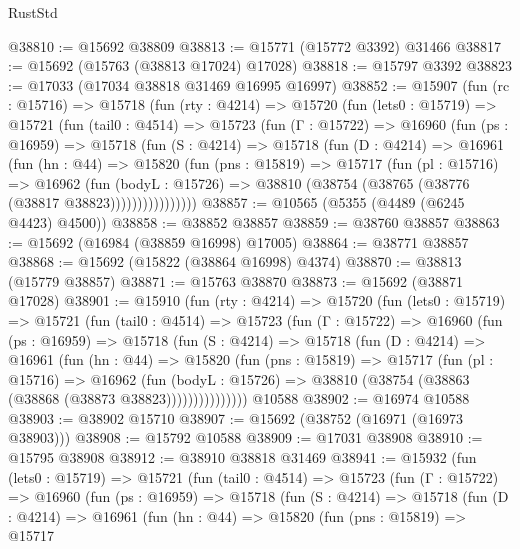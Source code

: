 \begin{lexlean}{RustStd}
\begin{coremodule}
@38810 := @15692 @38809
@38813 := @15771 (@15772 @3392) @31466
@38817 := @15692 (@15763 (@38813 @17024) @17028)
@38818 := @15797 @3392
@38823 := @17033 (@17034 @38818 @31469 @16995 @16997)
@38852 := @15907
    (fun (rc : @15716) =>
    @15718
      (fun (rty : @4214) =>
      @15720
        (fun (lets0 : @15719) =>
        @15721
          (fun (tail0 : @4514) =>
          @15723
            (fun (Γ : @15722) =>
            @16960
              (fun (ps : @16959) =>
              @15718
                (fun (S : @4214) =>
                @15718
                  (fun (D : @4214) =>
                  @16961
                    (fun (hn : @44) =>
                    @15820
                      (fun (pns : @15819) =>
                      @15717
                        (fun (pl : @15716) =>
                        @16962
                          (fun (bodyL : @15726) =>
                          @38810 (@38754 (@38765 (@38776 (@38817 @38823))))))))))))))))
@38857 := @10565 (@5355 (@4489 (@6245 @4423) @4500))
@38858 := @38852 @38857
@38859 := @38760 @38857
@38863 := @15692 (@16984 (@38859 @16998) @17005)
@38864 := @38771 @38857
@38868 := @15692 (@15822 (@38864 @16998) @4374)
@38870 := @38813 (@15779 @38857)
@38871 := @15763 @38870
@38873 := @15692 (@38871 @17028)
@38901 := @15910
    (fun (rty : @4214) =>
    @15720
      (fun (lets0 : @15719) =>
      @15721
        (fun (tail0 : @4514) =>
        @15723
          (fun (Γ : @15722) =>
          @16960
            (fun (ps : @16959) =>
            @15718
              (fun (S : @4214) =>
              @15718
                (fun (D : @4214) =>
                @16961
                  (fun (hn : @44) =>
                  @15820
                    (fun (pns : @15819) =>
                    @15717
                      (fun (pl : @15716) =>
                      @16962
                        (fun (bodyL : @15726) =>
                        @38810 (@38754 (@38863 (@38868 (@38873 @38823)))))))))))))))
    @10588
@38902 := @16974 @10588
@38903 := @38902 @15710
@38907 := @15692 (@38752 (@16971 (@16973 @38903)))
@38908 := @15792 @10588
@38909 := @17031 @38908
@38910 := @15795 @38908
@38912 := @38910 @38818 @31469
@38941 := @15932
    (fun (lets0 : @15719) =>
    @15721
      (fun (tail0 : @4514) =>
      @15723
        (fun (Γ : @15722) =>
        @16960
          (fun (ps : @16959) =>
          @15718
            (fun (S : @4214) =>
            @15718
              (fun (D : @4214) =>
              @16961
                (fun (hn : @44) =>
                @15820
                  (fun (pns : @15819) =>
                  @15717

\end{coremodule}
\end{lexlean}
